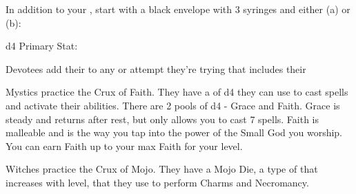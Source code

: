 {   {
    In addition to your , start with a black envelope with 3 syringes and either (a) or (b):
  }



  \HD d4 \hfill Primary Stat: \FOC
  

  Devotees add their \LVL to any \RO or \RB attempt they're trying that includes their \FOC


  Mystics practice the Crux of Faith.  They have a \POOL of d4 they can use to cast spells and activate their abilities.  There are 2 pools of d4 - Grace and Faith.  Grace is steady and returns after rest, but only allows you to cast 7 spells.  Faith is malleable and is the way you tap into the power of the Small God you worship. You can earn Faith up to your {max} Faith for your level.

  Witches practice the Crux of Mojo.  They have a Mojo Die, a type of \UD that increases with level, that they use to perform Charms and Necromancy.

}
